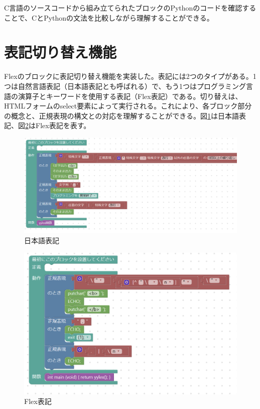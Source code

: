 \documentclass{risepaper}
\begin{document}
C言語のソースコードから組み立てられたブロックのPythonのコードを確認することで、CとPythonの文法を比較しながら理解することができる。
   
   \section{表記切り替え機能}
   
Flexのブロックに表記切り替え機能を実装した。表記には2つのタイプがある。1つは自然言語表記（日本語表記とも呼ばれる）で、もう1つはプログラミング言語の演算子とキーワードを使用する表記（Flex表記）である。切り替えは、HTMLフォームのselect要素によって実行される。これにより、各ブロック部分の概念と、正規表現の構文との対応を理解することができる。図\ref{fig:switching_ja}は日本語表記、図\ref{fig:switching_flex}はFlex表記を表す。

\begin{figure}[h]
\begin{center}
\includegraphics[scale=0.5]{img/switching_ja.PNG}
\caption{日本語表記}%
\label{fig:switching_ja}
\end{center}%
\end{figure}%

\begin{figure}[h]
\begin{center}
\includegraphics[scale=0.5]{img/switching_flex.PNG}
\caption{Flex表記}%
\label{fig:switching_flex}
\end{center}%
\end{figure}%
\end{document}
